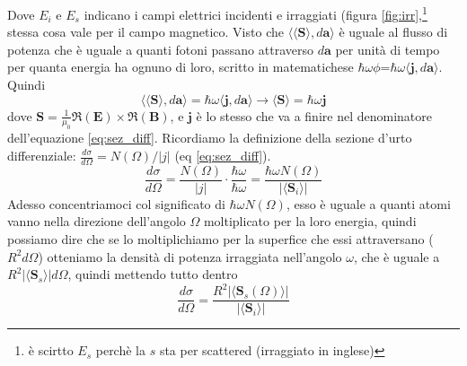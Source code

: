 \documentclass[11pt,a4paper]{article}
\newcommand{\vettore}[1]{\mathbf{#1}}
\newcommand{\pscal}[2]{\langle #1,#2\rangle}
\begin{document}
		Dove $E_{i}$ e $E_{s}$ indicano i campi elettrici incidenti e irraggiati (figura \ref{fig:irr},\footnote{è scirtto $E_s$ perchè la $s$ sta per scattered (irraggiato in inglese)} stessa cosa vale per il campo magnetico.\newline
		Visto che $\pscal{\langle\vettore S \rangle}{d\vettore{a}}$ è uguale al flusso di potenza che è uguale a quanti fotoni passano attraverso $d\vettore a$ per unità di tempo per quanta energia ha ognuno di loro, scritto in matematichese $\hbar \omega \phi$=$\hbar \omega \pscal{\vettore j}{d\vettore a}$. Quindi
		\begin{equation}
			\pscal{\langle\vettore S \rangle}{d\vettore{a}}=\hbar \omega \pscal{\vettore j}{d\vettore a}
			\rightarrow
			\langle\vettore S\rangle= \hbar \omega\vettore j
		\end{equation}
		dove $\vettore S=\frac{1}{\mu_0}\Re(\vettore E) \times \Re(\vettore B)$, e $\vettore j$ è lo stesso che va a finire nel denominatore dell'equazione \ref{eq:sez_diff}.\newline
		Ricordiamo la definizione della sezione d'urto differenziale: $\frac{d\sigma}{d\Omega}=N(\Omega)/|j|$ (eq \ref{eq:sez_diff}).
		\[
			\frac{d\sigma}{d\Omega}=\frac{N(\Omega)}{|j|}\cdot\frac{\hbar\omega}{\hbar \omega}=\frac{\hbar \omega N(\Omega)}{|\langle \vettore S_i\rangle|}
		\]
		Adesso concentriamoci col significato di $\hbar \omega N(\Omega)$, esso è uguale a quanti atomi vanno nella direzione dell'angolo $\Omega$ moltiplicato per la loro energia, quindi possiamo dire che se lo moltiplichiamo per la superfice che essi attraversano ($R^2d\Omega $) otteniamo la densità di potenza irraggiata nell'angolo $\omega $, che è uguale a $R^2|\langle \vettore {S}_s \rangle |d\Omega $, quindi mettendo tutto dentro
		\begin{equation}
			\frac{d\sigma}{d\Omega}=\frac{R^2|\langle \vettore S_s(\Omega) \rangle |}{|\langle \vettore S_i\rangle|}
		\end{equation}
\end{document}
